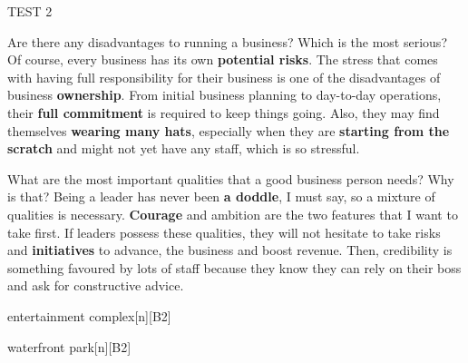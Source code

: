 \begin{glossarymc}[Cambridge 10]
\begin{test}{TEST 2}
    \begin{qa}{Are there any disadvantages to running a business? Which is the most serious?}
    Of course, every business has its own \textbf{potential risks}. The stress that comes with having full responsibility for their business is one of the disadvantages of business \textbf{ownership}. From initial business planning to day-to-day operations, their \textbf{full commitment} is required to keep things going. Also, they may find themselves \textbf{wearing many hats}, especially when they are \textbf{starting from the scratch} and might not yet have any staff, which is so stressful.
    \end{qa}

    \begin{qa}{What are the most important qualities that a good business person needs? Why is that?}
    Being a leader has never been \textbf{a doddle}, I must say, so a mixture of qualities is necessary. \textbf{Courage} and ambition are the two features that I want to take first. If leaders possess these qualities, they will not hesitate to take risks and \textbf{initiatives} to advance, the business and boost revenue. Then, credibility is something favoured by lots of staff because they know they can rely on their boss and ask for constructive advice.
    \end{qa}

        \begin{VocabExplain}[Part 3]
            \begin{ExplainCard}{entertainment complex}[n][B2]
            \end{ExplainCard}

            \begin{ExplainCard}{waterfront park}[n][B2]
            \end{ExplainCard}


\end{VocabExplain}
\end{test}
\end{glossarymc}
